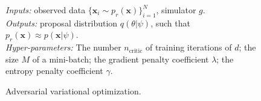 \documentclass[twocolumn,superscriptaddress,aps]{revtex4-1}
\theoremstyle{plain}
\begin{document}
\begin{figure}
    \begin{minipage}{\linewidth}
    \begin{algorithm}[H]
    \caption{Adversarial variational optimization.}

    \begin{flushleft}
        {\it Inputs:} observed data $\{ \mathbf{x}_i \sim p_r(\mathbf{x}) \}_{i=1}^N$, simulator $g$.\\
        {\it Outputs:} proposal distribution $q(\theta|\psi)$, such that $p_r(\mathbf{x}) \approx p(\mathbf{x}|\psi)$.\\
        {\it Hyper-parameters:} The number $n_{\text{critic}}$ of training iterations of $d$; the size $M$ of a mini-batch; the gradient penalty coefficient $\lambda$; the entropy penalty coefficient $\gamma$.
    \end{flushleft}

    \label{alg:avo}
    \begin{algorithmic}[1]
             
                \EndFor
            \EndFor
              
        \EndWhile
    \end{algorithmic}
    \end{algorithm}
    \end{minipage}
\end{figure}
\end{document}
